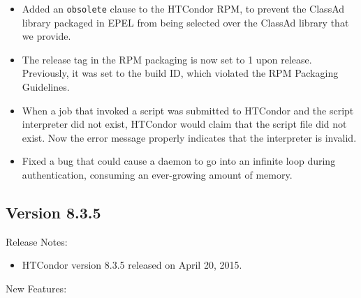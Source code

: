 \begin{itemize}
\item Added an \texttt{obsolete} clause to the HTCondor RPM,
to prevent the ClassAd library packaged in EPEL from being selected 
over the ClassAd library that we provide.

\item 
The release tag in the RPM packaging is now set to 1 upon release.
Previously, it was set to the build ID, which violated the RPM Packaging
Guidelines.

\item When a job that invoked a script was submitted to HTCondor and
the script interpreter did not exist, HTCondor would claim that the
script file did not exist.
Now the error message properly indicates that the interpreter is invalid.

\item Fixed a bug that could cause a daemon to go into an infinite loop
during authentication, consuming an ever-growing amount of memory.

\end{itemize}

\subsection*{\label{sec:New-8-3-5}Version 8.3.5}

\noindent Release Notes:

\begin{itemize}

\item HTCondor version 8.3.5 released on April 20, 2015.

\end{itemize}


\noindent New Features:

